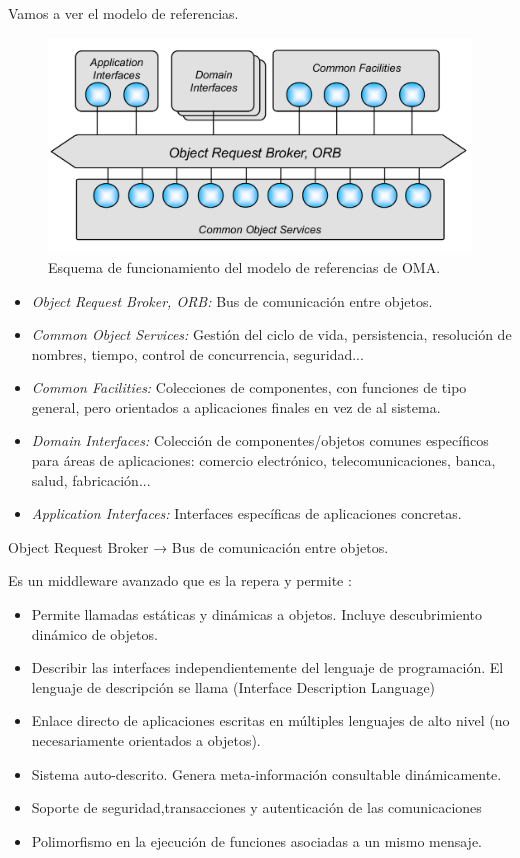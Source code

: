 Vamos a ver el modelo de referencias.


\begin{figure}[hbtp]
\centering
\includegraphics[width=1\textwidth]{img/OMA_Ref.png}
\caption{Esquema de funcionamiento del modelo de referencias de OMA.}
\label{OMA}
\end{figure}

\begin{itemize}
	\item \textit{Object Request Broker, ORB:} Bus de comunicación entre objetos.
	\item \textit{Common Object Services:} Gestión del ciclo de vida, persistencia, resolución de nombres, tiempo, control de concurrencia, seguridad...
	\item \textit{Common Facilities:} Colecciones de componentes, con funciones de tipo general, pero orientados a aplicaciones finales en vez de al sistema.
	\item \textit{Domain Interfaces:} Colección de componentes/objetos comunes específicos para áreas de aplicaciones: comercio electrónico, telecomunicaciones, banca, salud, fabricación...
	\item \textit{Application Interfaces:} Interfaces específicas de aplicaciones concretas.
\end{itemize}

\begin{defn}[ORB]
Object Request Broker → Bus de comunicación entre objetos.

Es un middleware avanzado que es la repera y permite :

\begin{itemize}
	\item Permite llamadas estáticas y dinámicas a objetos. Incluye descubrimiento dinámico de objetos.
	\item Describir las interfaces independientemente del lenguaje de programación. El lenguaje de descripción se llama \label{IDL} (Interface Description Language)
	\item Enlace directo de aplicaciones escritas en múltiples lenguajes de alto nivel (no necesariamente orientados a objetos).
	\item Sistema auto-descrito. Genera meta-información consultable dinámicamente.
	\item Soporte de seguridad,transacciones y autenticación de las comunicaciones
	\item Polimorfismo en la ejecución de funciones asociadas a un mismo mensaje.
\end{itemize}
\end{defn}

